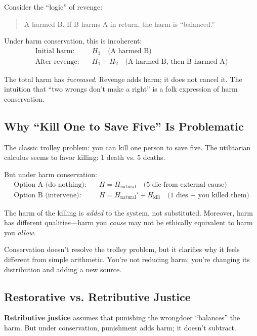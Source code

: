\documentclass[12pt,letterpaper]{article}
\theoremstyle{definition}
\theoremstyle{remark}
\begin{document}
Consider the ``logic'' of revenge:
\begin{quote}
A harmed B. If B harms A in return, the harm is ``balanced.''
\end{quote}

Under harm conservation, this is incoherent:
\begin{align}
\text{Initial harm:} \quad & H_1 \quad \text{(A harmed B)} \\
\text{After revenge:} \quad & H_1 + H_2 \quad \text{(A harmed B, then B harmed A)}
\end{align}

The total harm has \textit{increased}. Revenge adds harm; it does not cancel it. The intuition that ``two wrongs don't make a right'' is a folk expression of harm conservation.

\subsection{Why ``Kill One to Save Five'' Is Problematic}

The classic trolley problem: you can kill one person to save five. The utilitarian calculus seems to favor killing: 1 death vs. 5 deaths.

But under harm conservation:
\begin{align}
\text{Option A (do nothing):} \quad & H = H_{\text{natural}} \quad \text{(5 die from external cause)} \\
\text{Option B (intervene):} \quad & H = H_{\text{natural}}' + H_{\text{kill}} \quad \text{(1 dies + you killed them)}
\end{align}

The harm of the killing is \textit{added} to the system, not substituted. Moreover, harm has different qualities---harm you \textit{cause} may not be ethically equivalent to harm you \textit{allow}.

Conservation doesn't resolve the trolley problem, but it clarifies why it feels different from simple arithmetic. You're not reducing harm; you're changing its distribution and adding a new source.

\subsection{Restorative vs. Retributive Justice}

\textbf{Retributive justice} assumes that punishing the wrongdoer ``balances'' the harm. But under conservation, punishment adds harm; it doesn't subtract.
\end{document}
